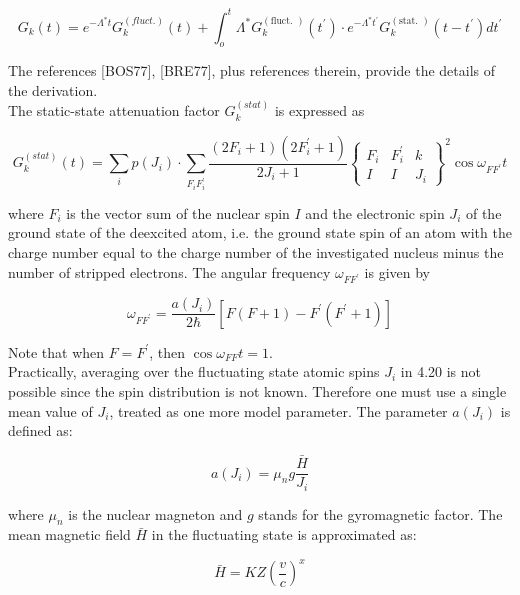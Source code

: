 \documentclass[10pt]{article}
\begin{document}
\begin{equation*}
G_{k}(t)=e^{-\Lambda^{*} t} G_{k}^{(f l u c t .)}(t)+\int_{o}^{t} \Lambda^{*} G_{k}^{(\text {fluct. })}\left(t^{\prime}\right) \cdot e^{-\Lambda^{*} t^{\prime}} G_{k}^{(\text {stat. })}\left(t-t^{\prime}\right) d t^{\prime} \tag{4.19}
\end{equation*}


The references [BOS77], [BRE77], plus references therein, provide the details of the derivation.\\
The static-state attenuation factor $G_{k}^{(s t a t)}$ is expressed as

\[
G_{k}^{(s t a t)}(t)=\sum_{i} p\left(J_{i}\right) \cdot \sum_{F_{i} F_{i}^{\prime}} \frac{\left(2 F_{i}+1\right)\left(2 F_{i}^{\prime}+1\right)}{2 J_{i}+1}\left\{\begin{array}{ccc}
F_{i} & F_{i}^{\prime} & k  \tag{4.20}\\
I & I & J_{i}
\end{array}\right\}^{2} \cos \omega_{F F^{\prime}} t
\]

where $F_{i}$ is the vector sum of the nuclear spin $I$ and the electronic spin $J_{i}$ of the ground state of the deexcited atom, i.e. the ground state spin of an atom with the charge number equal to the charge number of the investigated nucleus minus the number of stripped electrons. The angular frequency $\omega_{F F^{\prime}}$ is given by

$$
\omega_{F F^{\prime}}=\frac{a\left(J_{i}\right)}{2 \hbar}\left[F(F+1)-F^{\prime}\left(F^{\prime}+1\right)\right]
$$

Note that when $F=F^{\prime}$, then $\cos \omega_{F F} t=1$.\\
Practically, averaging over the fluctuating state atomic spins $J_{i}$ in 4.20 is not possible since the spin distribution is not known. Therefore one must use a single mean value of $J_{i}$, treated as one more model parameter. The parameter $a\left(J_{i}\right)$ is defined as:


\begin{equation*}
a\left(J_{i}\right)=\mu_{n} g \frac{\bar{H}}{J_{i}} \tag{4.21}
\end{equation*}


where $\mu_{n}$ is the nuclear magneton and $g$ stands for the gyromagnetic factor. The mean magnetic field $\bar{H}$ in the fluctuating state is approximated as:


\begin{equation*}
\bar{H}=K Z\left(\frac{v}{c}\right)^{x} \tag{4.22}
\end{equation*}
\end{document}
